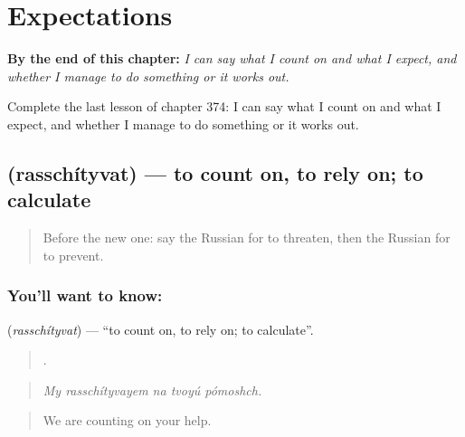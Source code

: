 
\chapter{Expectations}
\label{ch:ru-expectations}

\begin{chapteropening}
\textbf{By the end of this chapter:} \emph{I can say what I count on and what I expect, and whether I manage to do something or it works out.}

Complete the last lesson of chapter 374: I can say what I count on and what I expect, and whether I manage to do something or it works out.
\end{chapteropening}

\section[\texorpdfstring{\ru{рассчитывать} (rasschítyvat)}{рассчитывать (rasschítyvat)}]{ (rasschítyvat) — to count on, to rely on; to calculate}

\label{lesson:RU-C374-rasschityvat}



\begin{quote}
Before the new one: say the Russian for to threaten, then the Russian for to prevent.
\end{quote}

\subsection*{You'll want to know: }
\textbf{} (\emph{rasschítyvat}) — \textquotedblleft{}to count on, to rely on; to calculate\textquotedblright{}.

\begin{quote}
    .
\end{quote}

\begin{quote}
\emph{My rasschítyvayem na tvoyú pómoshch.}
\end{quote}

\begin{quote}
We are counting on your help.
\end{quote}

